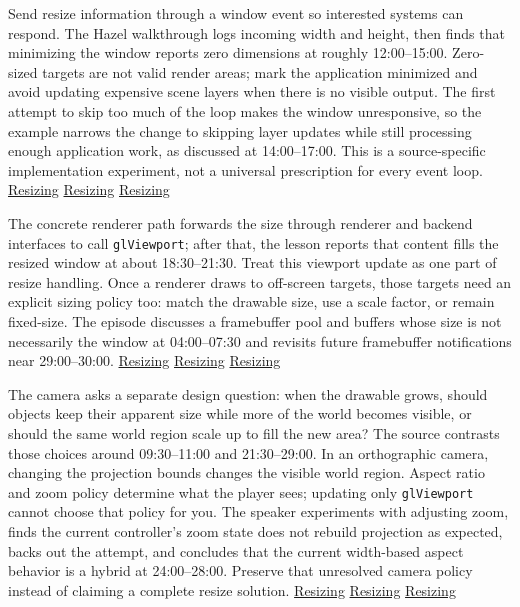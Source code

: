 Send resize information through a window event so interested systems can respond. The Hazel walkthrough logs incoming width and height, then finds that minimizing the window reports zero dimensions at roughly 12:00--15:00. Zero-sized targets are not valid render areas; mark the application minimized and avoid updating expensive scene layers when there is no visible output. The first attempt to skip too much of the loop makes the window unresponsive, so the example narrows the change to skipping layer updates while still processing enough application work, as discussed at 14:00--17:00. This is a source-specific implementation experiment, not a universal prescription for every event loop. \href{https://www.youtube.com/watch?v=7LswjvgRqbw&t=720s}{Resizing} \href{https://www.youtube.com/watch?v=7LswjvgRqbw&t=840s}{Resizing} \href{https://www.youtube.com/watch?v=7LswjvgRqbw&t=900s}{Resizing}

The concrete renderer path forwards the size through renderer and backend interfaces to call \texttt{glViewport}; after that, the lesson reports that content fills the resized window at about 18:30--21:30. Treat this viewport update as one part of resize handling. Once a renderer draws to off-screen targets, those targets need an explicit sizing policy too: match the drawable size, use a scale factor, or remain fixed-size. The episode discusses a framebuffer pool and buffers whose size is not necessarily the window at 04:00--07:30 and revisits future framebuffer notifications near 29:00--30:00. \href{https://www.youtube.com/watch?v=7LswjvgRqbw&t=1110s}{Resizing} \href{https://www.youtube.com/watch?v=7LswjvgRqbw&t=240s}{Resizing} \href{https://www.youtube.com/watch?v=7LswjvgRqbw&t=1740s}{Resizing}

The camera asks a separate design question: when the drawable grows, should objects keep their apparent size while more of the world becomes visible, or should the same world region scale up to fill the new area? The source contrasts those choices around 09:30--11:00 and 21:30--29:00. In an orthographic camera, changing the projection bounds changes the visible world region. Aspect ratio and zoom policy determine what the player sees; updating only \texttt{glViewport} cannot choose that policy for you. The speaker experiments with adjusting zoom, finds the current controller's zoom state does not rebuild projection as expected, backs out the attempt, and concludes that the current width-based aspect behavior is a hybrid at 24:00--28:00. Preserve that unresolved camera policy instead of claiming a complete resize solution. \href{https://www.youtube.com/watch?v=7LswjvgRqbw&t=570s}{Resizing} \href{https://www.youtube.com/watch?v=7LswjvgRqbw&t=1290s}{Resizing} \href{https://www.youtube.com/watch?v=7LswjvgRqbw&t=1440s}{Resizing}

